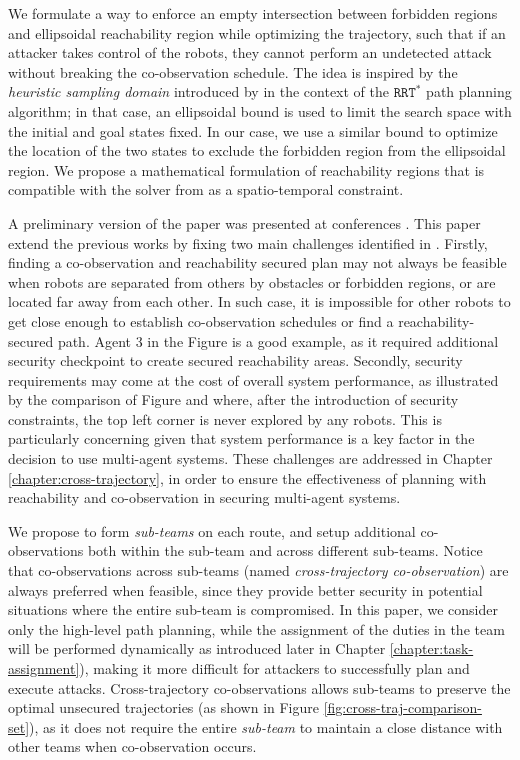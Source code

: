 \documentclass[journal]{IEEEtran}  %
\begin{document}
We formulate a way to enforce an empty intersection between forbidden regions and ellipsoidal reachability region while optimizing the trajectory, such that if an attacker takes control of the robots, they cannot perform an undetected attack without breaking the co-observation schedule.  The idea is inspired by the \emph{heuristic sampling domain} introduced by \cite{gammell2014informed} in the context of the $\mathtt{RRT^*}$ path planning algorithm; in that case, an ellipsoidal bound is used to limit the search space with the initial and goal states fixed. In our case, we use a similar bound to optimize the location of the two states to exclude the forbidden region from the ellipsoidal region. We propose a mathematical formulation of reachability regions that is compatible with the solver from  as a spatio-temporal constraint. 

A preliminary version of the paper was presented at conferences . This paper extend the previous works by fixing two main challenges identified in \cite{wardega2023hola} . Firstly, finding a co-observation and reachability secured plan may not always be feasible when robots are separated from others by obstacles or forbidden regions, or are located far away from each other. In such case, it is impossible for other robots to get close enough to establish co-observation schedules or find a reachability-secured path. Agent 3 in the Figure  is a good example, as it required additional security checkpoint to create secured reachability areas. Secondly, security requirements may come at the cost of overall system performance, as illustrated by the comparison of Figure  and  where, after the introduction of security constraints, the top left corner is never explored by any robots. This is particularly concerning given that system performance is a key factor in the decision to use multi-agent systems. These challenges are addressed in Chapter \ref{chapter:cross-trajectory}, in order to ensure the effectiveness of planning with reachability and co-observation in securing multi-agent systems.

We propose to form \emph{sub-teams} on each route, and setup additional co-observations both within the sub-team and across different sub-teams. Notice that co-observations across sub-teams (named \emph{cross-trajectory co-observation}) are always preferred when feasible, since they provide better security in potential situations where the entire sub-team is compromised.
In this paper, we consider only the high-level path planning, while the assignment of the duties in the team will be performed dynamically as introduced later in Chapter \ref{chapter:task-assignment}), making it more difficult for attackers to successfully plan and execute attacks. Cross-trajectory co-observations allows sub-teams to preserve the optimal unsecured trajectories (as shown in Figure \ref{fig:cross-traj-comparison-set}), as it does not require the entire \emph{sub-team} to maintain a close distance with other teams when co-observation occurs. 
\end{document}
